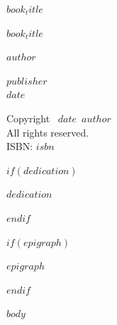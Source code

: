 \documentclass[12pt]{book}
\def\booktitle{$book_title$}
\def\bookauthor{$author$}
\def\bookdate{$date$}
\def\bookpublisher{$publisher$}
\begin{document}
\thispagestyle{empty}
\vspace*{2in}
\begin{center}
{\Huge\scshape\booktitle}
\end{center}

\clearpage
\thispagestyle{empty}
\vspace*{1in}
\begin{center}
{\Huge\scshape\booktitle\par}
\vspace{1in}
{\Large\scshape\bookauthor\par}
\vfill
{\large\scshape\bookpublisher}\\
{\scshape\bookdate}
\end{center}

\clearpage
\thispagestyle{empty}
\vspace*{\fill}
\begin{center}
Copyright \textcopyright\ \bookdate\ \bookauthor\\
All rights reserved.\\
ISBN: $isbn$
\end{center}
\vspace*{\fill}

$if(dedication)$
\clearpage
\thispagestyle{empty}
\vspace*{3in}
\begin{center}
\textit{$dedication$}
\end{center}
$endif$

$if(epigraph)$
\clearpage
\begin{center}
\textit{$epigraph$}
\end{center}
$endif$

\clearpage
\tableofcontents

\mainmatter

$body$
\end{document}
